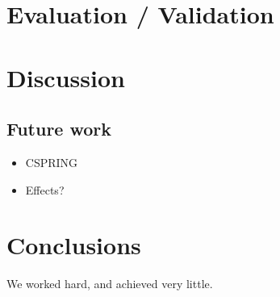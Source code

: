 \documentclass[12pt]{article}
\begin{document}
\section{Evaluation / Validation}\label{sec:evaluation}

\section{Discussion}\label{sec:discussion}

\subsection{Future work}\label{sec:future_work}

\begin{itemize}
  \item CSPRING
  \item Effects?
\end{itemize}

\section{Conclusions}\label{sec:conclusions}
We worked hard, and achieved very little.



\end{document}
